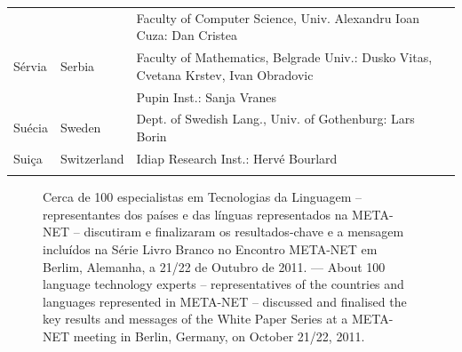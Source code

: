 \documentclass[]{../metanetpaper}
\begin{document}
\begin{longtable}{llp{105mm}}
  & & Faculty of Computer Science, Univ. Alexandru Ioan Cuza: Dan Cristea \\ \addlinespace
  Sérvia & \textcolor{grey1}{Serbia} & Faculty of Mathematics, Belgrade Univ.: Dusko Vitas, Cvetana Krstev, Ivan Obradovic \\ \addlinespace
  & & Pupin Inst.: Sanja Vranes \\ \addlinespace  
  Suécia & \textcolor{grey1}{Sweden} & Dept. of Swedish Lang., Univ. of Gothenburg: Lars Borin \\ \addlinespace 
  Suiça & \textcolor{grey1}{Switzerland} & Idiap Research Inst.: Hervé Bourlard \\ \addlinespace 
\end{longtable}
\normalsize

\renewcommand*{\figureformat}{}
\renewcommand*{\captionformat}{}

\begin{figure}[htbp]
  \center
  \caption{Cerca de 100 especialistas em Tecnologias da Linguagem -- representantes dos países e das línguas representados na META-NET -- discutiram e finalizaram os resultados-chave e a mensagem incluídos na Série Livro Branco no Encontro META-NET em Berlim, Alemanha, a 21/22 de Ou\-tu\-bro de 2011. --- \textcolor{grey1}{About 100 language technology experts -- representatives of the countries and languages represented in META-NET -- discussed and finalised the key results and messages of the White Paper Series at a META-NET meeting in Berlin, Germany, on October 21/22, 2011.}}
\end{figure}

\cleardoublepage

\label{whitepaperseries}
\end{document}
